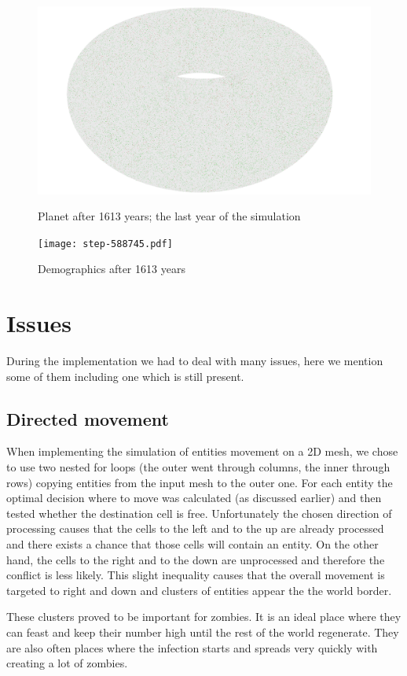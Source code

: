 \documentclass[a4paper]{article}
\begin{document}
\begin{figure}[pht]
    \centering
    \includegraphics[width=\textwidth]{torus/step-588745-torus.png}
    \caption{Planet after 1613 years; the last year of the simulation}
    \texttt{[image: step-588745.pdf]}
    \caption{Demographics after 1613 years}
\end{figure}

\section{Issues}

During the implementation we had to deal with many issues, here we mention some of them including one which is still present.

\subsection{Directed movement}

When implementing the simulation of entities movement on a 2D mesh, we chose to use two nested for loops (the outer went through columns, the inner through rows) copying entities from the input mesh to the outer one.
For each entity the optimal decision where to move was calculated (as discussed earlier) and then tested whether the destination cell is free.
Unfortunately the chosen direction of processing causes that the cells to the left and to the up are already processed and there exists a chance that those cells will contain an entity.
On the other hand, the cells to the right and to the down are unprocessed and therefore the conflict is less likely.
This slight inequality causes that the overall movement is targeted to right and down and clusters of entities appear the the world border.

These clusters proved to be important for zombies.
It is an ideal place where they can feast and keep their number high until the rest of the world regenerate.
They are also often places where the infection starts and spreads very quickly with creating a lot of zombies.
\end{document}
